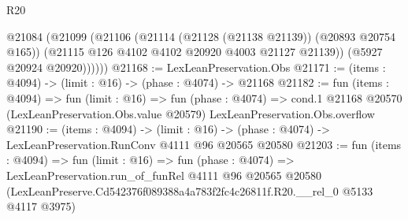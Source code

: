 \begin{lexlean}{R20}
\begin{coremodule}
          @21084
            (@21099
              (@21106
                (@21114 (@21128 (@21138 @21139)) (@20893 @20754 @165))
                (@21115 @126 @4102 @4102 @20920 @4003 @21127 @21139))
              (@5927 @20924 @20920))))))
@21168 := LexLeanPreservation.Obs
@21171 := (items : @4094) -> (limit : @16) -> (phase : @4074) -> @21168
@21182 := fun (items : @4094) =>
  fun (limit : @16) =>
  fun (phase : @4074) =>
  cond.{1} @21168 @20570 (LexLeanPreservation.Obs.value @20579) LexLeanPreservation.Obs.overflow
@21190 := (items : @4094) ->
  (limit : @16) -> (phase : @4074) -> LexLeanPreservation.RunConv @4111 @96 @20565 @20580
@21203 := fun (items : @4094) =>
  fun (limit : @16) =>
  fun (phase : @4074) =>
  LexLeanPreservation.run_of_funRel
    @4111
    @96
    @20565
    @20580
    (LexLeanPreserve.Cd542376f089388a4a783f2fc4c26811f.R20.__rel_0 @5133 @4117 @3975)
\end{coremodule}
\end{lexlean}
